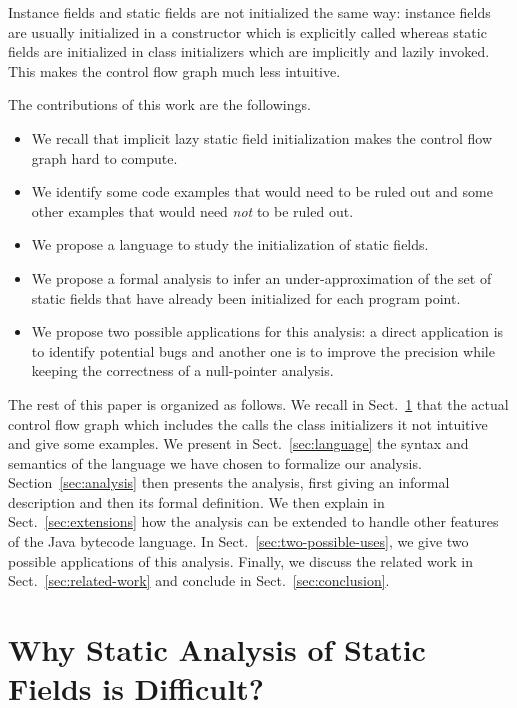 \documentclass{entcs}
\begin{document}
Instance fields and static fields are not initialized the same way:
instance fields are usually initialized in a constructor which is
explicitly called whereas static fields are initialized in class
initializers which are implicitly and lazily invoked.  This makes the
control flow graph much less intuitive.



The contributions of this work are the followings.
\begin{itemize}
\item We recall that implicit lazy static field initialization makes
  the control flow graph hard to compute.
\item We identify some code examples that would need to be ruled out
  and some other examples that would need \emph{not} to be ruled out.
\item We propose a language to study the initialization of static
  fields.
\item We propose a formal analysis to infer an under-approximation of
  the set of static fields that have already been initialized for each
  program point.
\item We propose two possible applications for this analysis: a direct
  application is to identify potential bugs and another one is to
  improve the precision while keeping the correctness of a
  null-pointer analysis.
\end{itemize}

The rest of this paper is organized as follows.  We recall in
Sect.~\ref{sec:why-difficult} that the actual control flow graph which
includes the calls the class initializers it not intuitive and give
some examples.  We present in Sect.~\ref{sec:language} the syntax and
semantics of the language we have chosen to formalize our analysis.
Section~\ref{sec:analysis} then presents the analysis, first giving an
informal description and then its formal definition.  We then explain
in Sect.~\ref{sec:extensions} how the analysis can be extended to
handle other features of the Java bytecode language.  In
Sect.~\ref{sec:two-possible-uses}, we give two possible applications
of this analysis.  Finally, we discuss the related work in
Sect.~\ref{sec:related-work} and conclude in
Sect.~\ref{sec:conclusion}.


\section{Why Static Analysis of Static Fields is Difficult?}
\label{sec:why-difficult}
\end{document}
